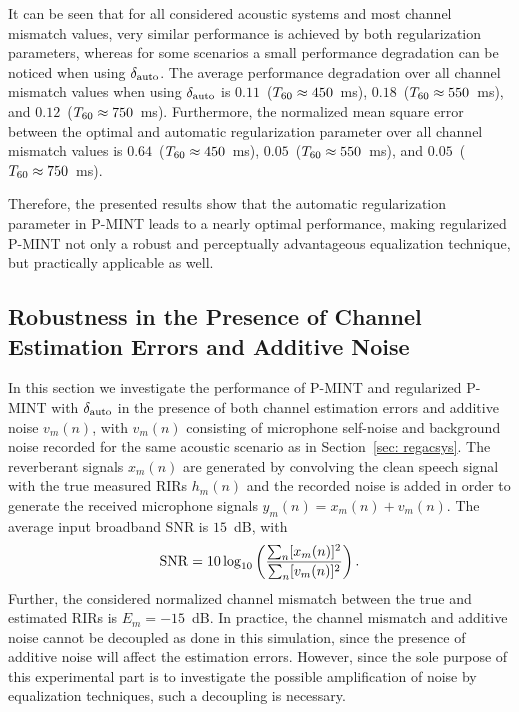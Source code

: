 \documentclass[10pt]{IEEEtran}
\begin{document}
It can be seen that for all considered acoustic systems and most channel mismatch values, very similar performance is achieved by both regularization parameters, whereas for some scenarios a small performance degradation can be noticed when using $\delta_{\rm auto}$.
The average performance degradation over all channel mismatch values when using $\delta_{\rm auto}$ is $0.11$~($T_{\rm 60} \approx 450$~ms), $0.18$~($T_{\rm 60} \approx 550$~ms), and $0.12$~($T_{\rm 60} \approx 750$~ms).
Furthermore, the normalized mean square error between the optimal and automatic regularization parameter over all channel mismatch values is $0.64$~($T_{\rm 60} \approx 450$~ms), $0.05$~($T_{\rm 60} \approx 550$~ms), and $0.05$~($T_{\rm 60} \approx 750$~ms).

Therefore, the presented results show that the automatic regularization parameter in P-MINT leads to a nearly optimal performance, making regularized P-MINT not only a robust and perceptually advantageous equalization technique, but practically applicable as well.

\subsection{Robustness in the Presence of Channel Estimation Errors and Additive Noise}
\label{sec: noise}
In this section we investigate the performance of P-MINT and regularized P-MINT with $\delta_{\rm auto}$ in the presence of both channel estimation errors and additive noise $v_m(n)$, with $v_m(n)$ consisting of microphone self-noise and background noise recorded for the same acoustic scenario as in Section~\ref{sec: regacsys}.
The reverberant signals $x_m(n)$ are generated by convolving the clean speech signal with the true measured RIRs $h_m(n)$ and the recorded noise is added in order to generate the received microphone signals $y_m(n) = x_m(n) + v_m(n)$. The average input broadband SNR is $15$~dB, with
\begin{equation}
  {\rm SNR} = 10 \log_{10} \left( \frac{\sum_{n} [x_m(n)]^2}{\sum_{n} [v_m(n)]^2}\right).
\end{equation}
Further, the considered normalized channel mismatch between the true and estimated RIRs is $E_m = -15$~dB.
In practice, the channel mismatch and additive noise cannot be decoupled as done in this simulation, since the presence of additive noise will affect the estimation errors. 
However, since the sole purpose of this experimental part is to investigate the possible amplification of noise by equalization techniques, such a decoupling is necessary.
\end{document}

